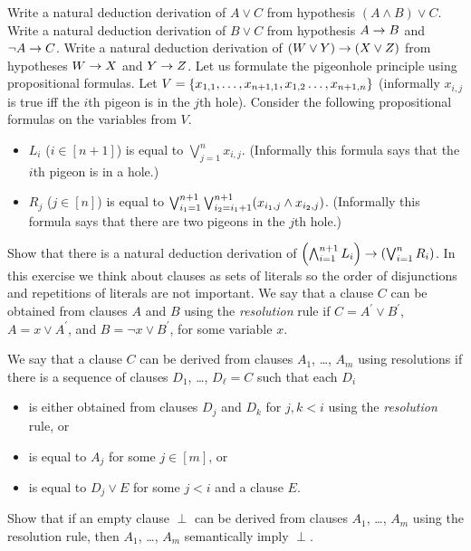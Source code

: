 \begin{chapterendexercises}
  \exercise  Write a natural deduction derivation of $A \lor C$ from
    hypothesis $(A \land B) \lor C$.
  \exercise Write a natural deduction derivation of $B \lor C$ from
    hypothesis $A \rightarrow B$ and $\lnot A \rightarrow C$.
  \exercise Write a natural deduction derivation of
    $(W \lor Y) \rightarrow (X \lor Z)$ from
    hypotheses $W \rightarrow X$ and $Y \rightarrow Z$.
  \exercise Let us formulate the pigeonhole principle using propositional
    formulas. Let
    $V = \set{x_{1, 1}, \dots, x_{n + 1, 1}, x_{1, 2} \dots, x_{n + 1, n}}$
    (informally $x_{i, j}$ is true iff the $i$th pigeon is in the $j$th hole).
    Consider the following propositional formulas on the variables from
    $V$.
    \begin{itemize}
      \item $L_i$ ($i \in [n + 1]$) is equal to $\bigvee_{j = 1}^n x_{i, j}$.
        (Informally this formula says that the $i$th pigeon is in a hole.)
      \item $R_j$ ($j \in [n]$) is equal to
        $\bigvee_{i_1 = 1}^{n + 1} \bigvee_{i_2 = i_1 + 1}^{n + 1}
        (x_{i_1, j} \land x_{i_2, j})$.
        (Informally this formula says that there are two pigeons in the $j$th
        hole.)
      \end{itemize}

      Show that there is a natural deduction derivation of
      $\left(
          \bigwedge_{i = 1}^{n + 1} L_i
        \right)
        \rightarrow
        \left(
          \bigvee_{i = 1}^{n} R_i
        \right)$.
    \exercise In this exercise we think about clauses as sets of literals so
      the order of disjunctions and repetitions of literals are not important.
      We say that a clause $C$ can be obtained from clauses $A$ and $B$
      using the \emph{resolution} rule if $C = A^\prime \lor B^\prime$,
      $A = x \lor A^\prime$, and $B = \lnot x \lor B^\prime$, for some variable
      $x$.

      We say that a clause $C$ can be derived from clauses $A_1$, \dots, $A_m$
      using resolutions
      if there is a sequence of clauses $D_1$, \dots, $D_\ell = C$ such that
      each $D_i$
      \begin{itemize}
        \item is either obtained from clauses $D_j$ and $D_k$ for $j, k < i$ using the
          \emph{resolution} rule, or
        \item is equal to $A_j$ for some $j \in [m]$, or
        \item is equal to $D_j \lor E$ for some $j < i$ and a clause $E$.
      \end{itemize}

      Show that if an empty clause $\perp$ can be derived from clauses $A_1$,
      \dots, $A_m$ using the resolution rule, then $A_1$, \dots, $A_m$
      semantically imply $\perp$.
\end{chapterendexercises}
